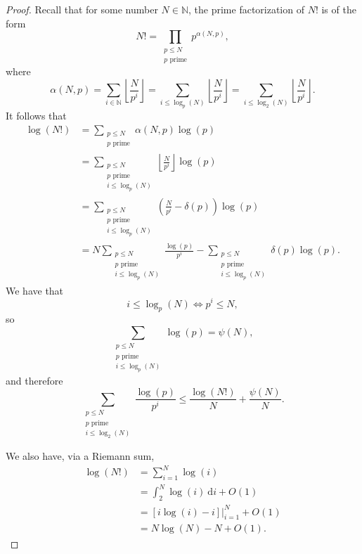 \documentclass[12pt,reqno]{amsart}
\begin{document}
\begin{proof}
Recall that for some number \(N \in \mathbb{N} \), the prime factorization of \(N!\) is of the form
\[
    N! = \prod _{\substack{ p \leq N \\ p \text{ prime}  }} p ^{\alpha(N,p)}
,\]
where
\[
    \alpha(N,p) = \sum _{i \in \mathbb{N} } \left\lfloor \frac{N}{p ^{i}}  \right\rfloor = \sum _{i \leq \log _{p} \left( N \right) } \left\lfloor \frac{N}{p ^{i}}  \right\rfloor  =\sum _{i \leq \log _{2} \left( N \right) } \left\lfloor \frac{N}{p ^{i}}  \right\rfloor 
.\]
It follows that
\begin{align*}
    \log \left( N! \right) & = \sum _{\substack{ p \leq N \\p \text{ prime}  }} \alpha(N,p) \log \left( p \right) \\
    & = \sum _{\substack{ p \leq N \\p \text{ prime} \\ i \leq \log _{p} \left( N \right)   }} \left\lfloor \frac{N}{p ^{i}}  \right\rfloor \log \left( p \right) \\
    & = \sum _{\substack{ p \leq N \\ p \text{ prime} \\ i \leq \log _{p} \left( N \right)  }} \left( \frac{N}{p ^{i}} - \delta(p) \right) \log \left( p \right) \\
    & = N\sum _{\substack{ p \leq N \\ p \text{ prime} \\ i \leq \log _{p} \left( N \right) }} \frac{\log \left( p \right) }{p ^{i}} - \sum _{\substack{ p \leq N \\ p \text{ prime} \\ i \leq \log _{p} \left( N \right)  }} \delta(p) \log \left( p \right) .
\end{align*}
We have that
\[
    i \leq \log _{p} \left( N \right) \iff p ^{i} \leq N
,\]
so
\[
    \sum  _{\substack{ p \leq N \\ p \text{ prime} \\ i \leq \log _{p} \left( N \right)  }} \log \left( p \right) = \psi(N)
,\]
and therefore
\[
    \sum _{\substack{ p \leq N \\ p \text{ prime} \\ i \leq \log _{2} \left( N \right)  }} \frac{\log \left( p \right) }{p ^{i}} \leq  \frac{\log \left( N! \right) }{N} + \frac{\psi(N)}{N} 
.\]

We also have, via a Riemann sum,
\begin{align*}
    \log \left( N! \right) & = \sum_{i=1}^{N} \log \left( i \right) \\
    & = \int_{2}^{N} \log \left( i \right)  ~\mathrm{d} i + O(1) \\
    & = \left. \left[ i\log \left( i \right) - i \right]  \right|_{i = 1}^{N} + O(1)\\
    & = N \log \left( N \right) - N + O(1).
\end{align*}


\end{proof}
\end{document}
